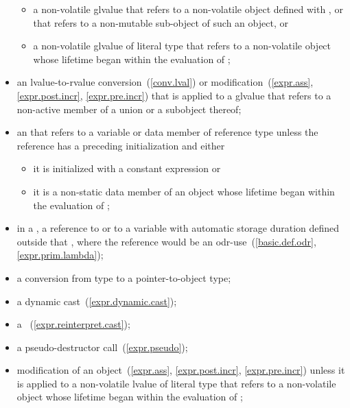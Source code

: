 \begin{itemize}
\begin{itemize}
  \item
  a non-volatile glvalue that refers to a non-volatile object
  defined with , or that refers to a non-mutable sub-object
  of such an object, or

  \item
  a non-volatile glvalue of literal type that refers to a non-volatile object
  whose lifetime began within the evaluation of ;
\end{itemize}

\item
an lvalue-to-rvalue conversion~(\ref{conv.lval}) or
modification~(\ref{expr.ass}, \ref{expr.post.incr}, \ref{expr.pre.incr})
that is applied to a glvalue
that refers to a non-active member of a union or a subobject thereof;

\item
an  that refers to a variable or
data member of reference type
unless the reference has a preceding initialization and either

\begin{itemize}
  \item
  it is initialized with a constant expression or

  \item
  it is a non-static data member of an object whose lifetime
  began within the evaluation of ;
\end{itemize}

\item
in a ,
a reference to  or to a variable with
automatic storage duration defined outside that
, where
the reference would be an odr-use~(\ref{basic.def.odr}, \ref{expr.prim.lambda});

\item
a conversion from type \cv{}  to a pointer-to-object type;

\item
a dynamic cast~(\ref{expr.dynamic.cast});

\item
a ~(\ref{expr.reinterpret.cast});

\item
a pseudo-destructor call~(\ref{expr.pseudo});

\item
modification of an object~(\ref{expr.ass}, \ref{expr.post.incr},
\ref{expr.pre.incr})
unless it is applied to a non-volatile lvalue of literal type
that refers to a non-volatile object
whose lifetime began within the evaluation of ;


\end{itemize}
